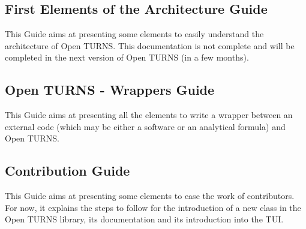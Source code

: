 \documentclass[11pt]{article}
\begin{document}
\subsection{First Elements of the Architecture Guide}

This Guide aims at presenting some elements to easily understand the architecture of Open TURNS. This documentation is not complete and will be completed in the next version of Open TURNS (in a few months).

% 

% 
% 
% 

\subsection{Open TURNS - Wrappers Guide}

This Guide aims at presenting all the elements to write a wrapper between an external code (which may be either a software or an analytical formula) and Open TURNS.


\subsection{Contribution Guide}

This Guide aims at presenting some elements to ease the work of contributors. For now, it explains the steps to follow for the introduction of a new class in the Open TURNS library, its documentation and its introduction into the TUI.
\end{document}

